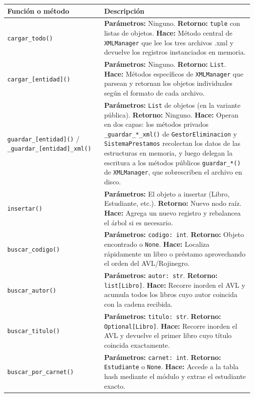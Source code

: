 \documentclass[11pt]{article}
\begin{document}
\begin{longtable}{p{} p{}}
\toprule
\textbf{Función o método} & \textbf{Descripción} \\
\midrule
\texttt{cargar\_todo()} & \textbf{Parámetros:} Ninguno. \textbf{Retorno:} \texttt{tuple} con listas de objetos. \textbf{Hace:} Método central de \texttt{XMLManager} que lee los tres archivos .xml y devuelve los registros instanciados en memoria. \\
\midrule
\texttt{cargar\_[entidad]()} & \textbf{Parámetros:} Ninguno. \textbf{Retorno:} \texttt{List}. \textbf{Hace:} Métodos específicos de \texttt{XMLManager} que parsean y retornan los objetos individuales según el formato de cada archivo. \\
\midrule
\texttt{guardar\_[entidad]()} / \texttt{\_guardar\_[entidad]\_xml()} & \textbf{Parámetros:} \texttt{List} de objetos (en la variante pública). \textbf{Retorno:} Ninguno. \textbf{Hace:} Operan en dos capas: los métodos privados \texttt{\_guardar\_*\_xml()} de \texttt{GestorEliminacion} y \texttt{SistemaPrestamos} recolectan los datos de las estructuras en memoria, y luego delegan la escritura a los métodos públicos \texttt{guardar\_*()} de \texttt{XMLManager}, que sobrescriben el archivo en disco. \\
\midrule
\texttt{insertar()} & \textbf{Parámetros:} El objeto a insertar (Libro, Estudiante, etc.). \textbf{Retorno:} Nuevo nodo raíz. \textbf{Hace:} Agrega un nuevo registro y rebalancea el árbol si es necesario. \\
\midrule
\texttt{buscar\_codigo()} & \textbf{Parámetros:} \texttt{codigo: int}. \textbf{Retorno:} Objeto encontrado o \texttt{None}. \textbf{Hace:} Localiza rápidamente un libro o préstamo aprovechando el orden del AVL/Rojinegro. \\
\midrule
\texttt{buscar\_autor()} & \textbf{Parámetros:} \texttt{autor: str}. \textbf{Retorno:} \texttt{list[Libro]}. \textbf{Hace:} Recorre inorden el AVL y acumula todos los libros cuyo autor coincida con la cadena recibida. \\
\midrule
\texttt{buscar\_titulo()} & \textbf{Parámetros:} \texttt{titulo: str}. \textbf{Retorno:} \texttt{Optional[Libro]}. \textbf{Hace:} Recorre inorden el AVL y devuelve el primer libro cuyo título coincida exactamente. \\
\midrule
\texttt{buscar\_por\_carnet()} & \textbf{Parámetros:} \texttt{carnet: int}. \textbf{Retorno:} \texttt{Estudiante} o \texttt{None}. \textbf{Hace:} Accede a la tabla hash mediante el módulo y extrae el estudiante exacto. \\

\end{longtable}
\end{document}
